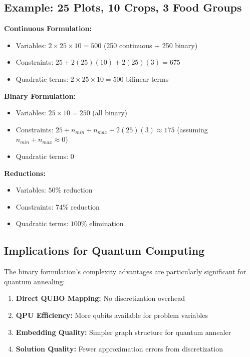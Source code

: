 \documentclass{article}
\begin{document}
\subsection{Example: 25 Plots, 10 Crops, 3 Food Groups}

\textbf{Continuous Formulation:}
\begin{itemize}
    \item Variables: $2 \times 25 \times 10 = 500$ (250 continuous + 250 binary)
    \item Constraints: $25 + 2(25)(10) + 2(25)(3) = 675$
    \item Quadratic terms: $2 \times 25 \times 10 = 500$ bilinear terms
\end{itemize}

\textbf{Binary Formulation:}
\begin{itemize}
    \item Variables: $25 \times 10 = 250$ (all binary)
    \item Constraints: $25 + n_{min} + n_{max} + 2(25)(3) \approx 175$ (assuming $n_{min} + n_{max} \approx 0$)
    \item Quadratic terms: $0$
\end{itemize}

\textbf{Reductions:}
\begin{itemize}
    \item Variables: $50\%$ reduction
    \item Constraints: $74\%$ reduction
    \item Quadratic terms: $100\%$ elimination
\end{itemize}

\subsection{Implications for Quantum Computing}

The binary formulation's complexity advantages are particularly significant for quantum annealing:

\begin{enumerate}
    \item \textbf{Direct QUBO Mapping:} No discretization overhead
    \item \textbf{QPU Efficiency:} More qubits available for problem variables
    \item \textbf{Embedding Quality:} Simpler graph structure for quantum annealer
    \item \textbf{Solution Quality:} Fewer approximation errors from discretization
\end{enumerate}
\end{document}

